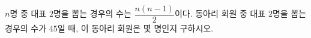 $n$명 중 대표 $2$명을 뽑는 경우의 수는 $\dfrac{n(n-1)}{2}$이다. 동아리 회원 중 대표 $2$명을 뽑는 경우의 수가 $45$일 때, 이 동아리 회원은 몇 명인지 구하시오.
